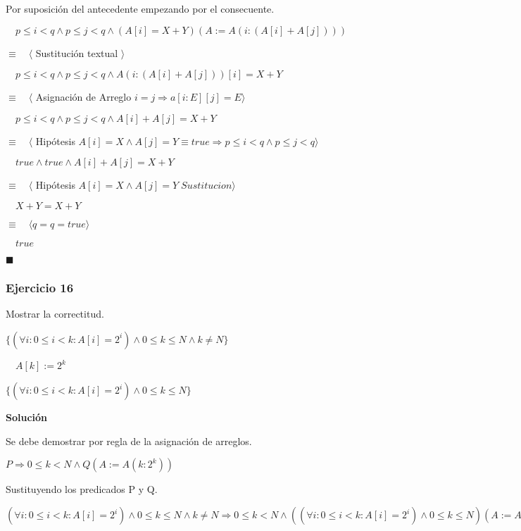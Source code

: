 \documentclass[hidelinks]{article}
\begin{document}
Por suposición del antecedente empezando por el consecuente.\par

$\quad p \leq i < q \land p \leq j < q \land (A[i] = X + Y)(A := A(i:(A[i]+A[j])))$\par
$\equiv \quad \langle$ Sustitución textual $ \rangle$\par
$\quad p \leq i < q \land p \leq j < q \land A(i:(A[i]+A[j]))[i] = X + Y$\par
$\equiv \quad \langle$ Asignación de Arreglo $ i = j \Rightarrow a[i:E][j] = E \rangle$\par
$\quad p \leq i < q \land p \leq j < q \land A[i]+A[j] = X + Y$\par
$\equiv \quad \langle$ Hipótesis $ A[i] = X \land A[j] = Y \equiv true \Rightarrow p \leq i < q \land p \leq j < q \rangle$\par
$\quad true \land true \land A[i]+A[j] = X + Y$\par
$\equiv \quad \langle$ Hipótesis $ A[i] = X \land A[j] = Y \; Sustitucion \rangle$\par
$\quad  X + Y = X + Y$\par
$\equiv \quad \langle q = q = true \rangle $\par
$\quad  true$\par
$\blacksquare$\par

\newpage

\subsubsection{Ejercicio 16}


Mostrar la correctitud.\par
$\{ (\forall i : 0 \leq i < k : A[i] = 2^i) \land 0 \leq k \leq N \land k \neq N\}$\par
$\quad A[k] := 2^k$\par
$\{ (\forall i : 0 \leq i < k : A[i] = 2^i) \land 0 \leq k \leq N\}$\par

\textbf{Solución}\par

Se debe demostrar por regla de la asignación de arreglos.\par
$P \Rightarrow 0 \leq k < N \land Q(A := A(k : 2^k))$\par
Sustituyendo los predicados P y Q.\par
$(\forall i : 0 \leq i < k : A[i] = 2^i) \land 0 \leq k \leq N \land k \neq N \Rightarrow 0 \leq k < N \land ((\forall i : 0 \leq i < k : A[i] = 2^i) \land 0 \leq k \leq N)(A := A(k : 2^k))$\par
\end{document}
